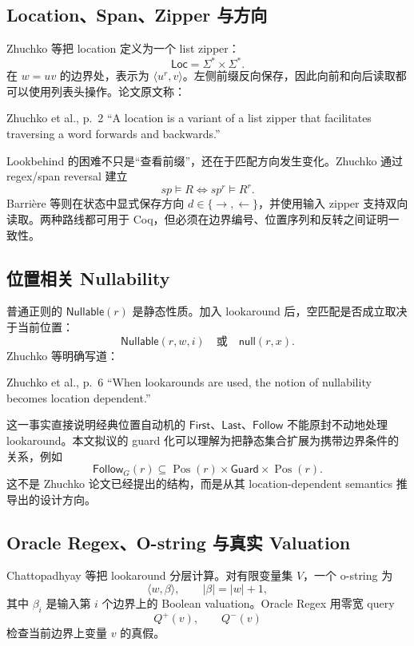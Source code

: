 \documentclass[UTF8,a4paper,12pt]{ctexart}
\begin{document}
\subsection{Location、Span、Zipper 与方向}

Zhuchko 等把 location 定义为一个 list zipper：
\[
\mathsf{Loc}=\Sigma^*\times\Sigma^*.
\]
在 $w=uv$ 的边界处，表示为 $\langle u^r,v\rangle$。左侧前缀反向保存，因此向前和向后读取都可以使用列表头操作。论文原文称：
\begin{paperquote}{Zhuchko et al., p.~2}
``A location is a variant of a list zipper that facilitates traversing a word forwards and backwards.''
\end{paperquote}

Lookbehind 的困难不只是“查看前缀”，还在于匹配方向发生变化。Zhuchko 通过 regex/span reversal 建立
\[
sp\models R\iff sp^r\models R^r.
\]
Barri\`ere 等则在状态中显式保存方向 $d\in\{\rightarrow,\leftarrow\}$，并使用输入 zipper 支持双向读取\cite[pp.~6--8]{barriere2026}。两种路线都可用于 Coq，但必须在边界编号、位置序列和反转之间证明一致性。

\subsection{位置相关 Nullability}

普通正则的 $\mathsf{Nullable}(r)$ 是静态性质。加入 lookaround 后，空匹配是否成立取决于当前位置：
\[
\mathsf{Nullable}(r,w,i)
\quad\text{或}\quad
\mathsf{null}(r,x).
\]
Zhuchko 等明确写道：
\begin{paperquote}{Zhuchko et al., p.~6}
``When lookarounds are used, the notion of nullability becomes location dependent.''
\end{paperquote}

这一事实直接说明经典位置自动机的 $\mathsf{First}$、$\mathsf{Last}$、$\mathsf{Follow}$ 不能原封不动地处理 lookaround。本文拟议的 guard 化可以理解为把静态集合扩展为携带边界条件的关系，例如
\[
\mathsf{Follow}_G(r)
\subseteq
\operatorname{Pos}(r)\times\mathsf{Guard}\times\operatorname{Pos}(r).
\]
这不是 Zhuchko 论文已经提出的结构，而是从其 location-dependent semantics 推导出的设计方向。

\subsection{Oracle Regex、O-string 与真实 Valuation}

Chattopadhyay 等把 lookaround 分层计算。对有限变量集 $V$，一个 o-string 为
\[
\langle w,\beta\rangle,
\qquad |\beta|=|w|+1,
\]
其中 $\beta_i$ 是输入第 $i$ 个边界上的 Boolean valuation。Oracle Regex 用零宽 query
\[
Q^+(v),\qquad Q^-(v)
\]
检查当前边界上变量 $v$ 的真假\cite[pp.~4--5]{chattopadhyay2025}。
\end{document}
